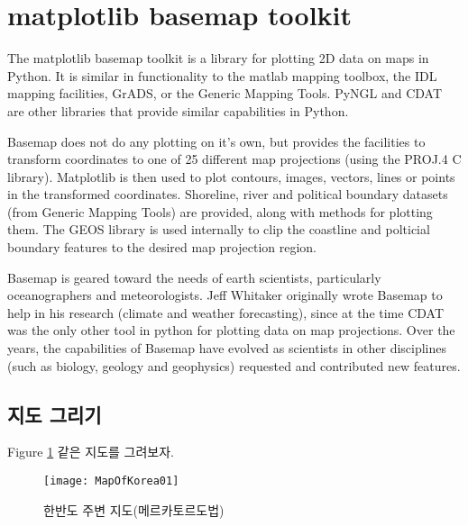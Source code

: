 \section{matplotlib basemap toolkit}

The matplotlib basemap toolkit is a library for plotting 2D data on maps in Python. It is similar in functionality to the matlab mapping toolbox, the IDL mapping facilities, GrADS, or the Generic Mapping Tools. PyNGL and CDAT are other libraries that provide similar capabilities in Python.

Basemap does not do any plotting on it’s own, but provides the facilities to transform coordinates to one of 25 different map projections (using the PROJ.4 C library). Matplotlib is then used to plot contours, images, vectors, lines or points in the transformed coordinates. Shoreline, river and political boundary datasets (from Generic Mapping Tools) are provided, along with methods for plotting them. The GEOS library is used internally to clip the coastline and polticial boundary features to the desired map projection region.

Basemap is geared toward the needs of earth scientists, particularly oceanographers and meteorologists. Jeff Whitaker originally wrote Basemap to help in his research (climate and weather forecasting), since at the time CDAT was the only other tool in python for plotting data on map projections. Over the years, the capabilities of Basemap have evolved as scientists in other disciplines (such as biology, geology and geophysics) requested and contributed new features.


\subsection{지도 그리기}

Figure \ref{fig:mapofkorea01} \과 같은 지도를 그려보자.
\begin{figure}[h]
	\centering
	\texttt{[image: MapOfKorea01]}
	\caption{한반도 주변 지도(메르카토르도법)}
	\label{fig:mapofkorea01}
\end{figure}



